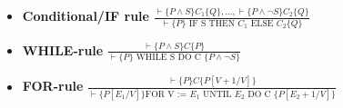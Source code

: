 \documentclass[11pt]{article}
\begin{document}
\begin{compactenum}
\begin{minipage}{\minpagw}
{{\begin{enumerate}
\begin{enumerate}
\begin{itemize}
                  \item \textbf{Conditional/IF rule} $\frac{\vdash \{P \wedge S\} C_1 \{Q\},...,\vdash\{P\wedge \neg S\}C_2\{Q\}}{\vdash \{P\} \text{ IF S THEN } C_1 \text{ ELSE } C_2 \{Q\}}$
                  \item \textbf{WHILE-rule} $\frac{\vdash \{P \wedge S \} C \{P\}}{\vdash \{P\} \text{ WHILE S DO C } \{P \wedge \neg S\}}$
                  \item \textbf{FOR-rule} $\frac{\vdash \{P\} C \{P[V+1/V]\}}{\vdash \{P[E_1/V]\} \text{FOR V := $E_1$ UNTIL $E_2$ DO C }\{P[E_2+1/V]\}}$
              \end{itemize}

              
            \end{enumerate}
        \end{enumerate}
          
}}
\end{minipage}
\end{compactenum}
\end{document}
